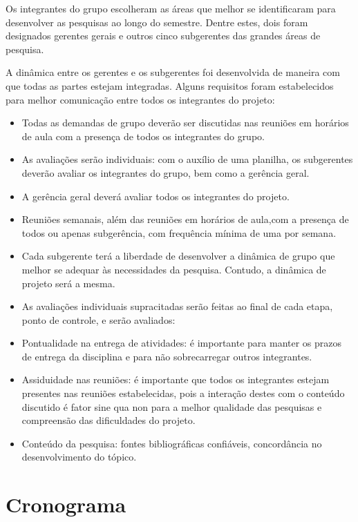   Os integrantes do grupo escolheram as áreas que melhor se identificaram para desenvolver as pesquisas ao longo do semestre. Dentre estes, dois foram designados gerentes gerais e outros cinco subgerentes das grandes áreas de pesquisa.

  A dinâmica entre os gerentes e os subgerentes foi desenvolvida de maneira com que todas as partes estejam integradas. Alguns requisitos foram estabelecidos para melhor comunicação entre todos os integrantes do projeto:

  \begin{itemize}
    \item Todas as demandas de grupo deverão ser discutidas nas reuniões em horários de aula com a presença de todos os integrantes do grupo.
    \item As avaliações serão individuais: com o auxílio de uma planilha, os subgerentes deverão avaliar os integrantes do grupo, bem como a gerência geral.
    \item A gerência geral deverá avaliar todos os integrantes do projeto.
    \item Reuniões semanais, além das reuniões em horários de aula,com a presença de todos ou apenas subgerência, com frequência mínima de uma por semana.
    \item Cada subgerente terá a liberdade de desenvolver a dinâmica de grupo que melhor se adequar às necessidades da pesquisa. Contudo, a dinâmica de projeto será a mesma.
    \item As avaliações individuais supracitadas serão feitas ao final de cada etapa, ponto de controle, e serão avaliados:
    \item Pontualidade na entrega de atividades: é importante para manter os prazos de entrega da disciplina e para não sobrecarregar outros integrantes.
    \item Assiduidade nas reuniões: é importante que todos os integrantes estejam presentes nas reuniões estabelecidas, pois a interação destes com o conteúdo discutido é fator sine qua non para a melhor qualidade das pesquisas e compreensão das dificuldades do projeto.
    \item Conteúdo da pesquisa: fontes bibliográficas confiáveis, concordância no desenvolvimento do tópico.
  \end{itemize}

\section{Cronograma}

